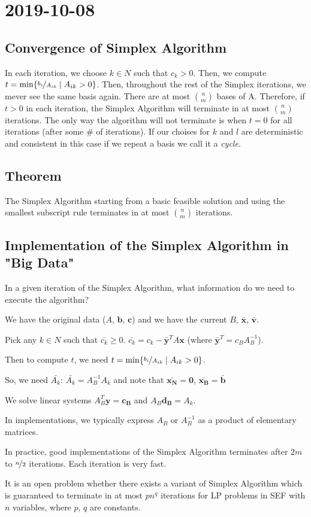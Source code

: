 \section{2019-10-08}
\subsection{Convergence of Simplex Algorithm}
In each iteration, we choose $k\in N$ such that $c_k>0$. Then, we compute 
$t=\min\{\nicefrac{b_i}{A_{ik}}\mid A_{ik}>0\}$. Then, throughout the
rest of the Simplex iterations, we mever see the same basis again. 
There are at most $\binom{n}{m}$ bases of A. Therefore, if $t>0$ in each iteration,
the Simplex Algorithm will terminate in at most $\binom{n}{m}$ iterations. The only
way the algorithm will not terminate is when $t=0$ for all iterations
(after some \# of iterations). If our choises for $k$ and $l$ are deterministic and
consistent in this case if we repeat a basis we call it a \emph{cycle}.

\subsection{Theorem}
The Simplex Algorithm starting from a basic feasible solution and using the
smallest subscript rule terminates in at most $\binom{n}{m}$ iterations.

\subsection{Implementation of the Simplex Algorithm in "Big Data"}
In a given iteration of the Simplex Algorithm, what information do we need to
execute the algorithm?

We have the original data ($A$, $\mathbf{b}$, $\mathbf{c}$) and we have the
current $B$, $\mathbf{\bar{x}}$, $\mathbf{\bar{v}}$.

Pick any $k\in N$ such that $\bar{c_k}\ge 0$. $\bar{c_k}=c_k-\mathbf{\bar{y}}^T A\mathbf{x}$ 
(where $\mathbf{\bar{y}}^T=c_B A_B^{-1}$).

Then to compute $t$, we need
$t=\min\{\nicefrac{b_i}{A_{ik}}\mid A_{ik}>0\}$.

So, we need
$\bar{A_k}$: $\bar{A_k}=A_B^{-1}A_k$ and note that $\mathbf{\bar{x_N}}=\mathbf{0}$,
$\mathbf{\bar{x_B}}=\mathbf{\bar{b}}$


We solve linear systems $A_B^T\mathbf{y}=\mathbf{c_B}$ and $A_B\mathbf{d_B}=A_k$.

In implementations, we typically express $A_B$ or $A_B^{-1}$ as a product of elementary
matrices.

In practice, good implementations of the Simplex Algorithm terminates after $2m$ to
$\nicefrac{n}{2}$ iterations. Each iteration is very fast.

It is an open problem whether there exists a variant of Simplex Algorithm which is
guaranteed to terminate in at most $pn^q$ iterations for LP problems in SEF with $n$
variables, where $p$, $q$ are constants.

